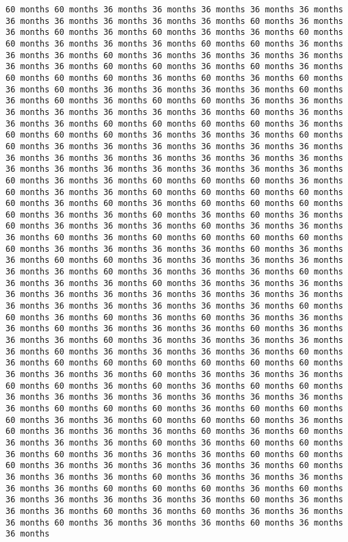 \documentclass[11pt]{article}
\begin{document}
\begin{Verbatim}[commandchars=\\\{\}, frame=single, framerule=2mm, rulecolor=\color{outerrorbackground}]
60 months 60 months 36 months 36 months 36 months 36 months 36 months 36 months 36 months 36 months 36 months 36 months 60 months 36 months 36 months 60 months 36 months 60 months 36 months 36 months 60 months 60 months 36 months 36 months 36 months 60 months 60 months 36 months 36 months 36 months 60 months 36 months 36 months 36 months 36 months 36 months 36 months 60 months 60 months 36 months 60 months 36 months 60 months 60 months 60 months 36 months 60 months 36 months 60 months 36 months 60 months 36 months 36 months 36 months 36 months 60 months 36 months 60 months 36 months 60 months 60 months 36 months 36 months 36 months 36 months 36 months 36 months 36 months 60 months 36 months 36 months 36 months 60 months 60 months 60 months 60 months 36 months 60 months 60 months 60 months 36 months 36 months 36 months 60 months 60 months 36 months 36 months 36 months 36 months 36 months 36 months 36 months 36 months 36 months 36 months 36 months 36 months 36 months 36 months 36 months 36 months 36 months 36 months 36 months 36 months 60 months 36 months 36 months 60 months 60 months 60 months 36 months 60 months 36 months 36 months 60 months 60 months 60 months 60 months 60 months 36 months 60 months 36 months 60 months 60 months 60 months 60 months 36 months 36 months 60 months 36 months 60 months 36 months 60 months 36 months 36 months 36 months 60 months 36 months 36 months 36 months 60 months 36 months 60 months 60 months 60 months 60 months 60 months 36 months 36 months 36 months 36 months 60 months 36 months 36 months 60 months 60 months 36 months 36 months 36 months 36 months 36 months 36 months 60 months 36 months 36 months 36 months 60 months 36 months 36 months 36 months 60 months 36 months 36 months 36 months 36 months 36 months 36 months 36 months 36 months 36 months 36 months 36 months 36 months 36 months 36 months 36 months 36 months 60 months 60 months 36 months 60 months 36 months 60 months 36 months 36 months 36 months 60 months 36 months 36 months 36 months 60 months 36 months 36 months 36 months 60 months 36 months 36 months 36 months 36 months 36 months 60 months 36 months 36 months 36 months 36 months 60 months 36 months 60 months 60 months 60 months 60 months 60 months 60 months 36 months 36 months 36 months 60 months 36 months 36 months 36 months 60 months 60 months 36 months 60 months 36 months 60 months 60 months 36 months 36 months 36 months 36 months 36 months 36 months 36 months 36 months 60 months 60 months 60 months 36 months 60 months 60 months 60 months 36 months 36 months 60 months 60 months 60 months 36 months 60 months 36 months 36 months 36 months 60 months 36 months 60 months 36 months 36 months 36 months 60 months 36 months 60 months 60 months 36 months 60 months 36 months 36 months 36 months 60 months 60 months 60 months 36 months 36 months 36 months 36 months 36 months 60 months 36 months 36 months 36 months 60 months 36 months 36 months 36 months 36 months 36 months 60 months 60 months 60 months 36 months 60 months 36 months 36 months 36 months 36 months 36 months 60 months 36 months 36 months 36 months 60 months 36 months 60 months 36 months 36 months 36 months 60 months 36 months 36 months 36 months 60 months 36 months 36 months 
\end{Verbatim}
\end{document}
